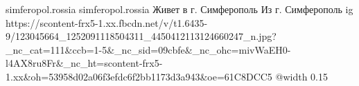  
 
 
 
 

\par
simferopol.rossia
simferopol.rossia
Живет в г. Симферополь
Из г. Симферополь
\ifcmt
  ig https://scontent-frx5-1.xx.fbcdn.net/v/t1.6435-9/123045664_1252091118504311_4450412113124660247_n.jpg?_nc_cat=111&ccb=1-5&_nc_sid=09cbfe&_nc_ohc=mivWaEH0-l4AX8ru8Fr&_nc_ht=scontent-frx5-1.xx&oh=53958d02a06f3efdc6f2bb1173d3a943&oe=61C8DCC5
  @width 0.15
\fi
